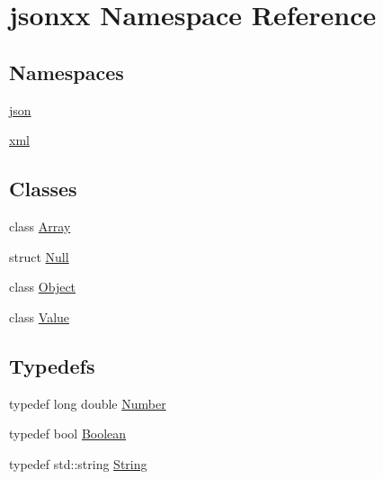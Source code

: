 \hypertarget{namespacejsonxx}{}\section{jsonxx Namespace Reference}
\label{namespacejsonxx}
\subsection*{Namespaces}
\begin{DoxyCompactItemize}
\item 
 \hyperlink{namespacejsonxx_1_1json}{json}
\item 
 \hyperlink{namespacejsonxx_1_1xml}{xml}
\end{DoxyCompactItemize}
\subsection*{Classes}
\begin{DoxyCompactItemize}
\item 
class \hyperlink{classjsonxx_1_1_array}{Array}
\item 
struct \hyperlink{structjsonxx_1_1_null}{Null}
\item 
class \hyperlink{classjsonxx_1_1_object}{Object}
\item 
class \hyperlink{classjsonxx_1_1_value}{Value}
\end{DoxyCompactItemize}
\subsection*{Typedefs}
\begin{DoxyCompactItemize}
\item 
typedef long double \hyperlink{namespacejsonxx_a189d79e326066a8e082664e4062f3fc8}{Number}
\item 
typedef bool \hyperlink{namespacejsonxx_aa700abaa02dfd30f2a09ba8e95c6f3eb}{Boolean}
\item 
typedef std\+::string \hyperlink{namespacejsonxx_a29c7a7494bb75c227bdbd208dc80a09f}{String}
\end{DoxyCompactItemize}
